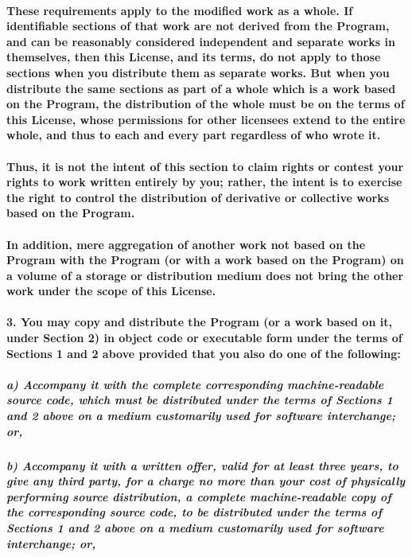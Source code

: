 \documentclass[english,letterpaper]{book}
\begin{document}
\paragraph{These requirements apply to the modified work as a whole. If identifiable
sections of that work are not derived from the Program, and can be
reasonably considered independent and separate works in themselves,
then this License, and its terms, do not apply to those sections when
you distribute them as separate works. But when you distribute the
same sections as part of a whole which is a work based on the Program,
the distribution of the whole must be on the terms of this License,
whose permissions for other licensees extend to the entire whole,
and thus to each and every part regardless of who wrote it.}


\paragraph{Thus, it is not the intent of this section to claim rights or contest
your rights to work written entirely by you; rather, the intent is
to exercise the right to control the distribution of derivative or
collective works based on the Program.}


\paragraph{In addition, mere aggregation of another work not based on the Program
with the Program (or with a work based on the Program) on a volume
of a storage or distribution medium does not bring the other work
under the scope of this License.}


\paragraph*{3. You may copy and distribute the Program (or a work based on it,
under Section 2) in object code or executable form under the terms
of Sections 1 and 2 above provided that you also do one of the following:}


\subparagraph*{a) Accompany it with the complete corresponding machine-readable
source code, which must be distributed under the terms of Sections
1 and 2 above on a medium customarily used for software interchange;
or,}


\subparagraph{b) Accompany it with a written offer, valid for at least three years,
to give any third party, for a charge no more than your cost of physically
performing source distribution, a complete machine-readable copy of
the corresponding source code, to be distributed under the terms of
Sections 1 and 2 above on a medium customarily used for software interchange;
or,}
\end{document}
